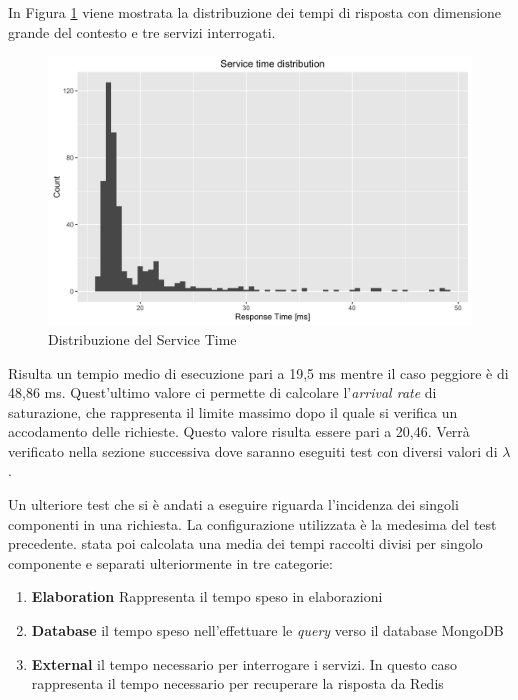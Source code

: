 In Figura \ref{fig:service-time-distribution} viene mostrata la distribuzione dei tempi di risposta con dimensione grande del contesto e tre servizi interrogati.

\begin{figure}[ht]
	\centering
	\includegraphics[width=\textwidth]{7-performance/Immagini/service_time_distribution.png}
	\caption{Distribuzione del Service Time}\label{fig:service-time-distribution}
\end{figure}

Risulta un tempio medio di esecuzione pari a 19,5 ms mentre il caso peggiore è di 48,86 ms. Quest'ultimo valore ci permette di calcolare l'\emph{arrival rate} di saturazione, che rappresenta il limite massimo dopo il quale si verifica un accodamento delle richieste. Questo valore risulta essere pari a 20,46. Verrà verificato nella sezione successiva dove saranno eseguiti test con diversi valori di $ \lambda $.

Un ulteriore test che si è andati a eseguire riguarda l'incidenza dei singoli componenti in una richiesta. La configurazione utilizzata è la medesima del test precedente. \upe stata poi calcolata una media dei tempi raccolti divisi per singolo componente e separati ulteriormente in tre categorie:

\begin{enumerate}
	\item \textbf{Elaboration}
	Rappresenta il tempo speso in elaborazioni
	\item \textbf{Database}
	\upe il tempo speso nell'effettuare le \emph{query} verso il database MongoDB
	\item \textbf{External}
	\upe il tempo necessario per interrogare i servizi. In questo caso rappresenta il tempo necessario per recuperare la risposta da Redis
\end{enumerate}

